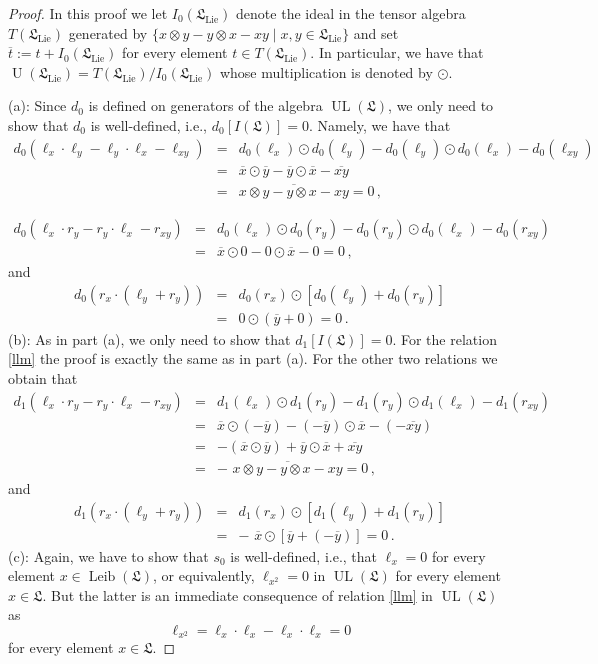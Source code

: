 \documentclass{jonasart}
\DeclareMathOperator{\leib}{Leib}
\DeclareMathOperator{\lie}{Lie}
\DeclareMathOperator{\U}{U}
\DeclareMathOperator{\UL}{UL}
\newcommand{\lf}{\mathfrak{L}}
\begin{document}
	\begin{proof}
		In this proof we let $I_0 (\lf_{\lie})$ denote the ideal in the tensor algebra $T(\lf_{\lie})$ generated by $\{x\otimes y-y\otimes x-xy\mid x,y\in\lf_{\lie}\}$ and set $\overline{t}:=t+I_0 (\lf_{\lie})$ for every element $t\in T(\lf_{\lie})$. In particular, we have that $\U(\lf_{\lie})
		=T(\lf_{\lie})/I_0 (\lf_{\lie})$ whose multiplication is denoted by $\odot$.

		(a): Since $d_0$ is defined on generators of the algebra $\UL(\lf)$, we only need to show that $d_0$ is well-defined, i.e., $d_0 [I(\lf)]
		=0$. Namely, we have that
		\begin{eqnarray*}
			d_0 (\ell_x\cdot\ell_y -\ell_y\cdot\ell_x -\ell_{xy}) & = &
			d_0 (\ell_x )\odot d_0 (\ell_y )-d_0 (\ell_y )\odot d_0 (\ell_x )-d_0 (\ell_{xy})\\
			& = & \overline{x}\odot\overline{y}-\overline{y}\odot
			\overline{x}-\overline{xy}\\
			& = & \overline{x\otimes y-y\otimes x-xy}=0\,,
		\end{eqnarray*}

		\begin{eqnarray*}
			d_0 (\ell_x\cdot r_y -r_y\cdot\ell_x -r_{xy}) & = & d_0 (\ell_x )
			\odot d_0 (r_y )-d_0 (r_y )
			\odot d_0 (\ell_x )-d_0 (r_{xy})\\
			& = & \overline{x}\odot 0-0\odot\overline{x}-0=0\,,
		\end{eqnarray*}
        and
		\begin{eqnarray*}
			d_0 (r_x\cdot(\ell_y +r_y )) & = & d_0 (r_x )\odot[d_0 (\ell_y )+d_0 (r_y )]\\
			& = & 0\odot(\overline{y}+0)=0\,.
		\end{eqnarray*}
		(b): As in part (a), we only need to show that $d_1 [I(\lf)]=0$. For the relation \eqref{llm} the proof is exactly the same as in part (a). For the other two relations we obtain that
		\begin{eqnarray*}
			d_1 (\ell_x\cdot r_y -r_y\cdot\ell_x -r_{xy}) & = & d_1 (\ell_x )\odot d_1 (r_y )-d_1 (r_y )\odot d_1 (\ell_x )-d_1 (r_{xy})\\
			& = & \overline{x}\odot(-\overline{y})-(-\overline{y})\odot\overline{x}
			-(-\overline{xy})\\
			& = & -(\overline{x}\odot\overline{y})+\overline{y}\odot\overline{x}
			+\overline{xy}\\
			& = & -\,\,\overline{x\otimes y-y\otimes x-xy}=0\,,
		\end{eqnarray*}
		and
		\begin{eqnarray*}
			d_1 (r_x\cdot(\ell_y +r_y )) & = & d_1 (r_x )\odot[d_1 (\ell_y )+d_1 (r_y )]\\
			& = & -\,\,\overline{x}\odot[\overline{y}+(-\overline{y})]=0\,.
		\end{eqnarray*}
		(c): Again, we have to show that $s_0$ is well-defined, i.e., that $\ell_x =0$
		for every element $x\in\leib(\lf)$, or equivalently, $\ell_{x^2}=0$ in
		$\UL(\lf)$ for every element $x\in\lf$. But the latter is an immediate consequence of relation \eqref{llm} in $\UL(\lf)$ as
		\[
			\ell_{x^2}=\ell_x\cdot\ell_x -\ell_x\cdot\ell_x =0
		\]
		for every element $x\in\lf$.


\end{proof}
\end{document}

